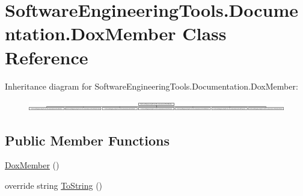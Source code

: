 \hypertarget{class_software_engineering_tools_1_1_documentation_1_1_dox_member}{\section{Software\+Engineering\+Tools.\+Documentation.\+Dox\+Member Class Reference}
\label{class_software_engineering_tools_1_1_documentation_1_1_dox_member}
}
Inheritance diagram for Software\+Engineering\+Tools.\+Documentation.\+Dox\+Member\+:\begin{figure}[H]
\begin{center}
\leavevmode
\includegraphics[height=0.463768cm]{class_software_engineering_tools_1_1_documentation_1_1_dox_member}
\end{center}
\end{figure}
\subsection*{Public Member Functions}
\begin{DoxyCompactItemize}
\item 
\hyperlink{class_software_engineering_tools_1_1_documentation_1_1_dox_member_a4c854f8c5483f1a92a6ebd615326a927}{Dox\+Member} ()
\item 
override string \hyperlink{class_software_engineering_tools_1_1_documentation_1_1_dox_member_ae3b4ea987fe5642fd3f2de0161e7f6c5}{To\+String} ()
\end{DoxyCompactItemize}
